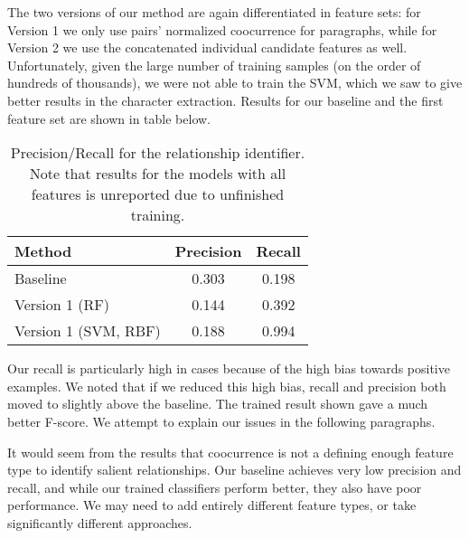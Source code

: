 \documentclass[12pt]{article}
\begin{document}
        The two versions of our method are again differentiated in feature sets: for Version 1 we only use
        pairs' normalized coocurrence for paragraphs, while for Version 2 we use the concatenated
        individual candidate features as well. Unfortunately, given the large number of training 
        samples (on the order of hundreds of thousands), we were not able to train the SVM, 
        which we saw to give better results in the character extraction. 
        Results for our baseline and the first feature set are shown in table below.

        \begin{table}[H]
        \begin{center}
            \begin{tabular}{l|c|c}
                \textbf{Method} & \textbf{Precision} & \textbf{Recall} \\ 
                \hline
                Baseline & 0.303 & 0.198 \\
                \hline
                Version 1 (RF) & 0.144 & 0.392 \\
                \hline
                Version 1 (SVM, RBF) & 0.188 & 0.994 \\
            \end{tabular}
            \caption{Precision/Recall for the relationship identifier. Note that results for the models with all features is unreported due to unfinished training.}
        \end{center}
        \end{table}

        Our recall is particularly high in cases because of the high bias towards positive examples.
        We noted that if we reduced this high bias, recall and precision both moved to slightly
        above the baseline. The trained result shown gave a much better F-score. 
        We attempt to explain our issues in the following paragraphs.

        It would seem from the results that coocurrence is not a defining enough feature type to
        identify salient relationships. Our baseline achieves very low precision and recall, and while
        our trained classifiers perform better, they also have poor performance. We may need to add entirely different feature types, or take significantly different
        approaches. \\
\end{document}
